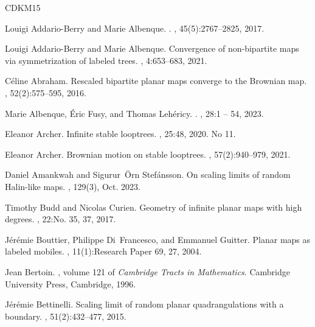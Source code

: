 \documentclass[british, a4paper,11pt]{article}
\numberwithin{equation}{section}
\theoremstyle{definition}
\begin{document}
{\small

%
\begin{thebibliography}{CDKM15}

Louigi Addario-Berry and Marie Albenque.
.
, 45(5):2767--2825, 2017.

Louigi Addario-Berry and Marie Albenque.
\newblock Convergence of non-bipartite maps via symmetrization of labeled
  trees.
, 4:653--683, 2021.

C{\'e}line Abraham.
\newblock Rescaled bipartite planar maps converge to the {B}rownian map.
, 52(2):575--595,
  2016.

Marie Albenque, {\'E}ric Fusy, and Thomas Leh{\'e}ricy.
.
, 28:1 -- 54, 2023.

Eleanor Archer.
\newblock Infinite stable looptrees.
, 25:48, 2020.
\newblock No 11.

Eleanor Archer.
\newblock Brownian motion on stable looptrees.
, 57(2):940--979,
  2021.

Daniel Amankwah and Sigur{\dh}ur~\"{O}rn Stef\'{a}nsson.
\newblock On scaling limits of random {H}alin-like maps.
, 129(3), Oct. 2023.

Timothy Budd and Nicolas Curien.
\newblock Geometry of infinite planar maps with high degrees.
, 22:No. 35, 37, 2017.

J{\'e}r{\'e}mie Bouttier, Philippe Di~Francesco, and Emmanuel Guitter.
\newblock Planar maps as labeled mobiles.
, 11(1):Research Paper 69, 27, 2004.

Jean Bertoin.
, volume 121 of {\em Cambridge Tracts in
  Mathematics}.
\newblock Cambridge University Press, Cambridge, 1996.

J\'er\'emie Bettinelli.
\newblock Scaling limit of random planar quadrangulations with a boundary.
, 51(2):432--477,
  2015.


\end{thebibliography}}
\end{document}
